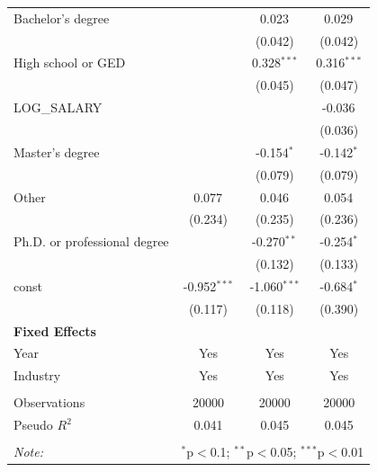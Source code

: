 \begin{table}[!htbp]
\begin{tabular}{@{\extracolsep{5pt}}lccc}
 Bachelor's degree & & 0.023$^{}$ & 0.029$^{}$ \\
& & (0.042) & (0.042) \\
 High school or GED & & 0.328$^{***}$ & 0.316$^{***}$ \\
& & (0.045) & (0.047) \\
 LOG_SALARY & & & -0.036$^{}$ \\
& & & (0.036) \\
 Master's degree & & -0.154$^{*}$ & -0.142$^{*}$ \\
& & (0.079) & (0.079) \\
 Other & 0.077$^{}$ & 0.046$^{}$ & 0.054$^{}$ \\
& (0.234) & (0.235) & (0.236) \\
 Ph.D. or professional degree & & -0.270$^{**}$ & -0.254$^{*}$ \\
& & (0.132) & (0.133) \\
 const & -0.952$^{***}$ & -1.060$^{***}$ & -0.684$^{*}$ \\
& (0.117) & (0.118) & (0.390) \\
 \textbf{Fixed Effects} &  &  &  \\
 Year & Yes & Yes & Yes \\
 Industry & Yes & Yes & Yes \\
\hline \\[-1.8ex]
 Observations & 20000 & 20000 & 20000 \\
 Pseudo $R^2$ & 0.041 & 0.045 & 0.045 \\
\hline
\hline \\[-1.8ex]
\textit{Note:} & \multicolumn{3}{r}{$^{*}$p$<$0.1; $^{**}$p$<$0.05; $^{***}$p$<$0.01} \\
\end{tabular}
\end{table}